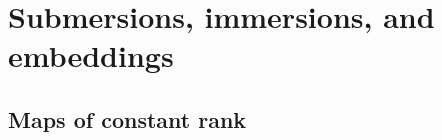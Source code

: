 
\chapter{Submersions, immersions, and embeddings}

\section{Maps of constant rank}

\begin{definition}
    
\end{definition}
